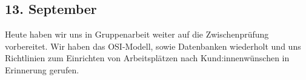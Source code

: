 \subsection{13. September}
Heute haben wir uns in Gruppenarbeit weiter auf die Zwischenprüfung vorbereitet. Wir haben das OSI-Modell, sowie Datenbanken wiederholt und uns Richtlinien zum Einrichten von Arbeitsplätzen nach Kund:innenwünschen in Erinnerung gerufen.